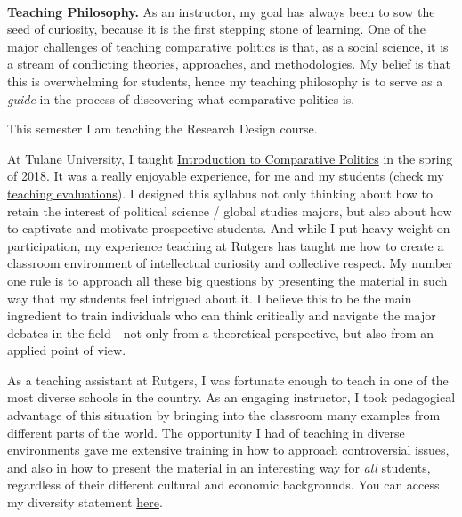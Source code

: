 \vspace{-2cm}{\bf \huge Teaching Statement}\\

{\bf Teaching Philosophy.} As an instructor, my goal has always been to sow the seed of curiosity, because it is the first stepping stone of learning. One of the major challenges of teaching comparative politics is that, as a social science, it is a stream of conflicting theories, approaches, and methodologies. My belief is that this is overwhelming for students, hence my teaching philosophy is to serve as a \emph{guide} in the process of discovering what comparative politics is.

This semester I am teaching the Research Design course.

At Tulane University, I taught \href{https://github.com/hbahamonde/Comparative_Politics_UGRAD/raw/master/Bahamonde_Comparative_Politics_Syllabus_UGRAD.pdf}{Introduction to Comparative Politics} in the spring of 2018. It was a really enjoyable experience, for me and my students (check my \href{https://github.com/hbahamonde/Job_Market/raw/master/Bahamonde_Research_Portafolio.pdf}{teaching evaluations}). I designed this syllabus not only thinking about how to retain the interest of political science / global studies majors, but also about how to captivate and motivate prospective students. And while I put heavy weight on participation, my experience teaching at Rutgers has taught me how to create a classroom environment of intellectual curiosity and collective respect. My number one rule is to approach all these big questions by presenting the material in such way that my students feel intrigued about it. I believe this to be the main ingredient to train individuals who can think critically and navigate the major debates in the field---not only from a theoretical perspective, but also from an applied point of view.

As a teaching assistant at Rutgers, I was fortunate enough to teach in one of the most diverse schools in the country. As an engaging instructor, I took pedagogical advantage of this situation by bringing into the classroom many examples from different parts of the world. The opportunity I had of teaching in diverse environments gave me extensive training in how to approach controversial issues, and also in how to present the material in an interesting way for \emph{all} students, regardless of their different cultural and economic backgrounds. You can access my diversity statement \href{http://github.com/hbahamonde/Job_Market/raw/master/Bahamonde_Diversity_Statement.pdf}{here}.


